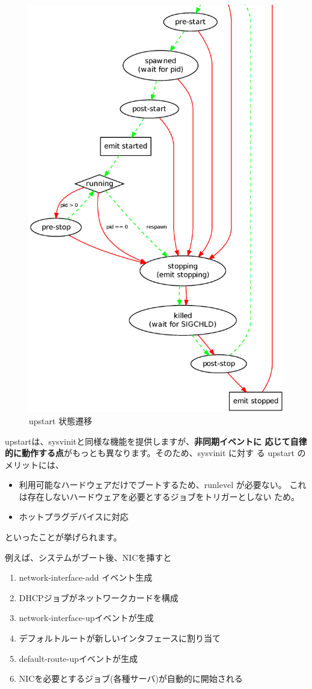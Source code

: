 \documentclass[mingoth,a4paper]{jsarticle}
\begin{document}
\begin{figure}[thbp]
\begin{center}
\caption{upstart 状態遷移}
\includegraphics[height=0.7\hsize]{image201002/states.eps}
\end{center}
\end{figure}

\clearpage

upstartは、sysvinitと同様な機能を提供しますが、\textbf{非同期イベントに
応じて自律的に動作する点}がもっとも異なります。そのため、sysvinit に対す
る upstart のメリットには、
\begin{itemize}
 \item 利用可能なハードウェアだけでブートするため、runlevel が必要ない。
       これは存在しないハードウェアを必要とするジョブをトリガーとしない
       ため。
 \item ホットプラグデバイスに対応
\end{itemize}
といったことが挙げられます。

例えば、システムがブート後、NICを挿すと
\begin{enumerate}
 \item network-interface-add イベント生成
 \item DHCPジョブがネットワークカードを構成
 \item network-interface-upイベントが生成
 \item デフォルトルートが新しいインタフェースに割り当て
 \item default-route-upイベントが生成
 \item NICを必要とするジョブ(各種サーバ)が自動的に開始される
\end{enumerate}
\end{document}
